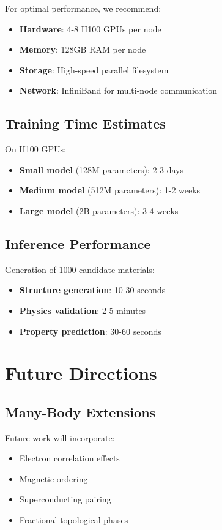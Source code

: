 \documentclass[12pt,a4paper]{article}
\begin{document}
For optimal performance, we recommend:
\begin{itemize}
\item \textbf{Hardware}: 4-8 H100 GPUs per node
\item \textbf{Memory}: 128GB RAM per node
\item \textbf{Storage}: High-speed parallel filesystem
\item \textbf{Network}: InfiniBand for multi-node communication
\end{itemize}

\subsection{Training Time Estimates}

On H100 GPUs:
\begin{itemize}
\item \textbf{Small model} (128M parameters): 2-3 days
\item \textbf{Medium model} (512M parameters): 1-2 weeks  
\item \textbf{Large model} (2B parameters): 3-4 weeks
\end{itemize}

\subsection{Inference Performance}

Generation of 1000 candidate materials:
\begin{itemize}
\item \textbf{Structure generation}: 10-30 seconds
\item \textbf{Physics validation}: 2-5 minutes
\item \textbf{Property prediction}: 30-60 seconds
\end{itemize}

\section{Future Directions}

\subsection{Many-Body Extensions}

Future work will incorporate:
\begin{itemize}
\item Electron correlation effects
\item Magnetic ordering
\item Superconducting pairing
\item Fractional topological phases
\end{itemize}
\end{document}

